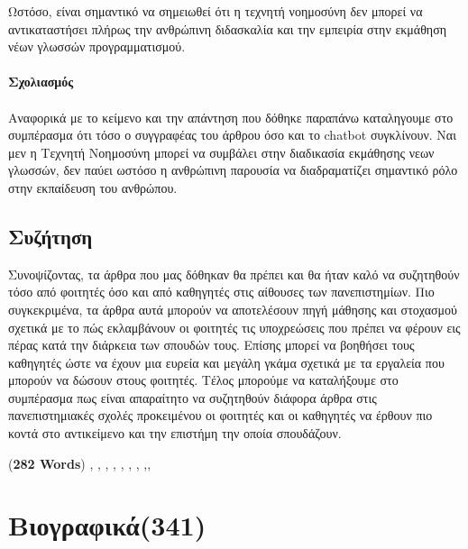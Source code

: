 \documentclass{report}
\begin{document}
Ωστόσο, είναι σημαντικό να σημειωθεί ότι η τεχνητή νοημοσύνη δεν μπορεί να αντικαταστήσει πλήρως την ανθρώπινη διδασκαλία και την εμπειρία στην εκμάθηση νέων γλωσσών προγραμματισμού.\\
\textbf{\\Σχολιασμός}\\\\
Αναφορικά με το κείμενο και την απάντηση που δόθηκε παραπάνω καταληγουμε στο συμπέρασμα ότι τόσο ο συγγραφέας του άρθρου όσο και το chatbot  συγκλίνουν. Ναι μεν η Τεχνητή Νοημοσύνη μπορεί να συμβάλει στην διαδικασία εκμάθησης νεων γλωσσών, δεν παύει ωστόσο η ανθρώπινη παρουσία να διαδραματίζει σημαντικό ρόλο στην εκπαίδευση του ανθρώπου. 


\section{\textbf{Συζήτηση}}
Συνοψίζοντας, τα άρθρα που μας δόθηκαν θα πρέπει και θα ήταν καλό να συζητηθούν τόσο από φοιτητές όσο και από καθηγητές στις αίθουσες των πανεπιστημίων. Πιο συγκεκριμένα, τα άρθρα αυτά μπορούν να αποτελέσουν πηγή μάθησης και στοχασμού σχετικά με το πώς εκλαμβάνουν οι φοιτητές τις υποχρεώσεις που πρέπει να φέρουν εις πέρας κατά την διάρκεια των σπουδών τους. Επίσης μπορεί να βοηθήσει τους καθηγητές ώστε να έχουν μια ευρεία και μεγάλη γκάμα σχετικά με τα εργαλεία που μπορούν να δώσουν στους φοιτητές. Τέλος μπορούμε να καταλήξουμε στο συμπέρασμα πως είναι απαραίτητο να συζητηθούν διάφορα άρθρα στις πανεπιστημιακές σχολές προκειμένου οι φοιτητές και οι καθηγητές να έρθουν πιο κοντά στο αντικείμενο και την επιστήμη την οποία σπουδάζουν.


{
\printbibliography(\textbf{282 Words}) \cite{denny2023conversing}, \cite{lahtinen2005study}, \cite{kramer2007abstraction}, \cite{robins2003learning}, \cite{tshukudu2020understanding}, \cite{shrestha2020here}, \cite{strijbos2004designing}, \cite{finnie2023my},\cite{dillenbourg1999you}, \cite{dillenbourg2010technology}}

\chapter{Βιογραφικά(341)}
\end{document}
